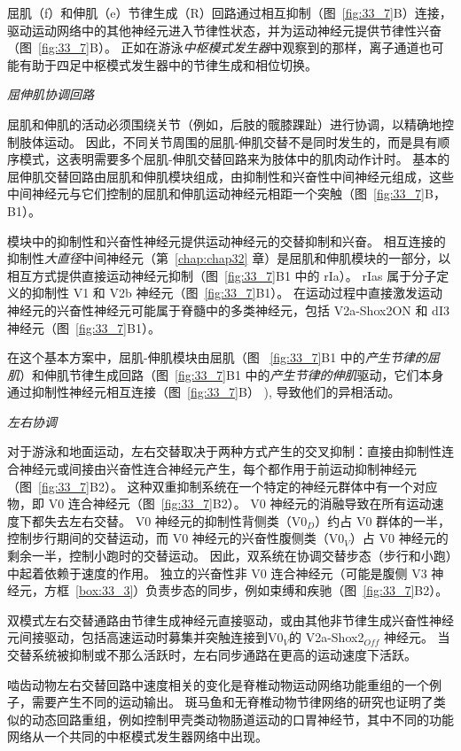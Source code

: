 屈肌（f）和伸肌（e）节律生成（R）回路通过相互抑制（图~\ref{fig:33_7}B）连接，驱动运动网络中的其他神经元进入节律性状态，并为运动神经元提供节律性兴奋（图~\ref{fig:33_7}B）。
正如在游泳\textit{中枢模式发生器}中观察到的那样，离子通道也可能有助于四足中枢模式发生器中的节律生成和相位切换。


\textit{屈伸肌协调回路}

屈肌和伸肌的活动必须围绕关节（例如，后肢的髋膝踝趾）进行协调，以精确地控制肢体运动。
因此，不同关节周围的屈肌-伸肌交替不是同时发生的，而是具有顺序模式，这表明需要多个屈肌-伸肌交替回路来为肢体中的肌肉动作计时。
基本的屈伸肌交替回路由屈肌和伸肌模块组成，由抑制性和兴奋性中间神经元组成，这些中间神经元与它们控制的屈肌和伸肌运动神经元相距一个突触（图~\ref{fig:33_7}B，B1）。


模块中的抑制性和兴奋性神经元提供运动神经元的交替抑制和兴奋。
相互连接的抑制性\textit{大直径}中间神经元（第~\ref{chap:chap32} 章）是屈肌和伸肌模块的一部分，以相互方式提供直接运动神经元抑制（图~\ref{fig:33_7}B1 中的 rIa）。
rIas 属于分子定义的抑制性 V1 和 V2b 神经元（图~\ref{fig:33_7}B1）。
在运动过程中直接激发运动神经元的兴奋性神经元可能属于脊髓中的多类神经元，包括 V2a-Shox2ON 和 dI3 神经元（图~\ref{fig:33_7}B1）。


在这个基本方案中，屈肌-伸肌模块由屈肌（图 ~\ref{fig:33_7}B1 中的\textit{产生节律的屈肌}）和伸肌节律生成回路（图~\ref{fig:33_7}B1 中的\textit{产生节律的伸肌}驱动，它们本身通过抑制性神经元相互连接（图~\ref{fig:33_7}B） ), 导致他们的异相活动。


\textit{左右协调}

对于游泳和地面运动，左右交替取决于两种方式产生的交叉抑制：直接由抑制性连合神经元或间接由兴奋性连合神经元产生，每个都作用于前运动抑制神经元（图~\ref{fig:33_7}B2）。
这种双重抑制系统在一个特定的神经元群体中有一个对应物，即 V0 连合神经元（图~\ref{fig:33_7}B2）。
V0 神经元的消融导致在所有运动速度下都失去左右交替。
V0 神经元的抑制性背侧类（V0$_D$）约占 V0 群体的一半，控制步行期间的交替运动，而 V0 神经元的兴奋性腹侧类（V0$_V$）占 V0 神经元的剩余一半，控制小跑时的交替运动。
因此，双系统在协调交替步态（步行和小跑）中起着依赖于速度的作用。
独立的兴奋性非 V0 连合神经元（可能是腹侧 V3 神经元，方框~\ref{box:33_3}）负责步态的同步，例如束缚和疾驰（图~\ref{fig:33_7}B2）。


双模式左右交替通路由节律生成神经元直接驱动，或由其他非节律生成兴奋性神经元间接驱动，包括高速运动时募集并突触连接到V0$_V$的 V2a-Shox2$_{Off}$ 神经元。
当交替系统被抑制或不那么活跃时，左右同步通路在更高的运动速度下活跃。


啮齿动物左右交替回路中速度相关的变化是脊椎动物运动网络功能重组的一个例子，需要产生不同的运动输出。
斑马鱼和无脊椎动物节律网络的研究也证明了类似的动态回路重组，例如控制甲壳类动物肠道运动的口胃神经节，其中不同的功能网络从一个共同的中枢模式发生器网络中出现。



